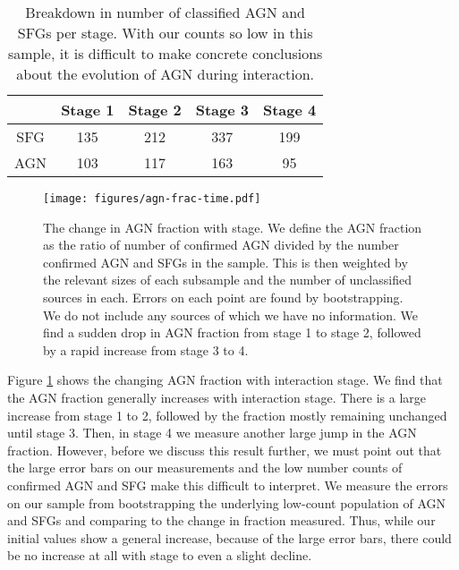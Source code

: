 \documentclass[fleqn,usenatbib]{mnras}
\begin{document}
\begin{table}
    \centering
    \begin{tabular}{|c|c|c|c|c|}
         & Stage 1 & Stage 2 & Stage 3 & Stage 4 \\
         \hline
        SFG & 135 & 212 & 337 & 199 \\
        AGN & 103 & 117 & 163 & 95
    \end{tabular}
    \caption{Breakdown in number of classified AGN and SFGs per stage. With our counts so low in this sample, it is difficult to make concrete conclusions about the evolution of AGN during interaction.}
    \label{tab:agn-sfg-breakdown}
\end{table}

\begin{figure}
    \centering
    \texttt{[image: figures/agn-frac-time.pdf]}
    \caption{The change in AGN fraction with stage. We define the AGN fraction as the ratio of number of confirmed AGN divided by the number confirmed AGN and SFGs in the sample. This is then weighted by the relevant sizes of each subsample and the number of unclassified sources in each. Errors on each point are found by bootstrapping. We do not include any sources of which we have no information. We find a sudden drop in AGN fraction from stage 1 to stage 2, followed by a rapid increase from stage 3 to 4.}
    \label{fig:agn-frac-time}
\end{figure}

Figure \ref{fig:agn-frac-time} shows the changing AGN fraction with interaction stage. We find that the AGN fraction generally increases with interaction stage. There is a large increase from stage 1 to 2, followed by the fraction mostly remaining unchanged until stage 3. Then, in stage 4 we measure another large jump in the AGN fraction. However, before we discuss this result further, we must point out that the large error bars on our measurements and the low number counts of confirmed AGN and SFG make this difficult to interpret. We measure the errors on our sample from bootstrapping the underlying low-count population of AGN and SFGs and comparing to the change in fraction measured. Thus, while our initial values show a general increase, because of the large error bars, there could be no increase at all with stage to even a slight decline.
\end{document}
